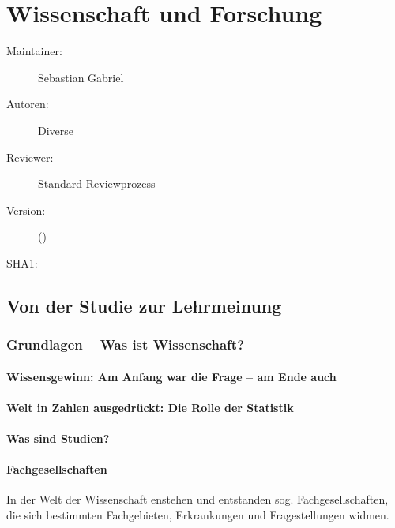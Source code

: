 \def\ChapterCode{WIS}
\chapter
[\CO{[WIS]} Wissenschaft und Forschung]
{Wissenschaft und Forschung}
\label{chp:WIS}



\ChapterIntro
{%
\SectionUnderDevelopment
}
{%
\begin{description}
  \item[Maintainer:] Sebastian Gabriel
  \item[Autoren:] Diverse
  \item[Reviewer:] Standard-Reviewprozess
  \item[Version:] {\DocVersion} ({\DocVersionInfo})
  \item[SHA1:] {\DocGitCommit}
\end{description}

{\TxTeilkapitelAASS}
}

\section{Von der Studie zur Lehrmeinung}

\subsection{Grundlagen -- Was ist Wissenschaft?}

\subsubsection{Wissensgewinn: Am Anfang war die Frage -- am
Ende auch}

\subsubsection{Welt in Zahlen ausgedrückt: Die Rolle der
Statistik}

\subsubsection{Was sind Studien?}

\subsubsection{Fachgesellschaften}

In der Welt der Wissenschaft enstehen und entstanden sog.
Fachgesellschaften, die sich bestimmten Fachgebieten,
Erkrankungen und Fragestellungen widmen.

